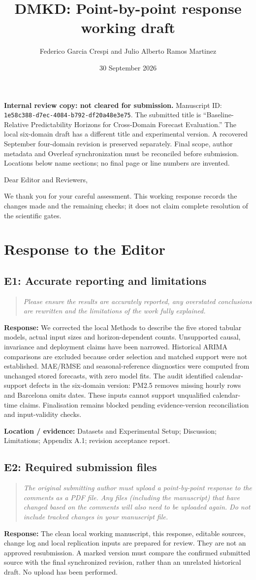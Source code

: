 \documentclass[11pt,a4paper]{article}
\title{DMKD: Point-by-point response working draft}
\author{Federico Garcia Crespi and Julio Alberto Ramos Martinez}
\date{30 September 2026}
\newcommand{\comment}[2]{\subsection*{#1}\begin{quote}\emph{#2}\end{quote}}
\newcommand{\response}[1]{\noindent\textcolor{responseblue}{\textbf{Response:}} #1\par\medskip}
\newcommand{\location}[1]{\noindent\textbf{Location / evidence:} #1\par\medskip}
\begin{document}
\maketitle
\noindent\textbf{Internal review copy: not cleared for submission.}
Manuscript ID: \texttt{1e58c388-d7ec-4084-b792-df20a48e3e75}.
The submitted title is ``Baseline-Relative Predictability Horizons for
Cross-Domain Forecast Evaluation.'' The local six-domain draft has a different
title and experimental version. A recovered September four-domain revision
is preserved separately. Final scope, author metadata and Overleaf
synchronization must be reconciled before submission. Locations below name
sections; no final page or line numbers are invented.

\medskip\noindent Dear Editor and Reviewers,

We thank you for your careful assessment. This working response records the
changes made and the remaining checks; it does not claim complete resolution
of the scientific gates.

\section*{Response to the Editor}
\comment{E1: Accurate reporting and limitations}{Please ensure the results are accurately reported, any overstated conclusions are rewritten and the limitations of the work fully explained.}
\response{We corrected the local Methods to describe the five stored tabular models, actual input sizes and horizon-dependent counts. Unsupported causal, invariance and deployment claims have been narrowed. Historical ARIMA comparisons are excluded because order selection and matched support were not established. MAE/RMSE and seasonal-reference diagnostics were computed from unchanged stored forecasts, with zero model fits. The audit identified calendar-support defects in the six-domain version: PM2.5 removes missing hourly rows and Barcelona omits dates. These inputs cannot support unqualified calendar-time claims. Finalisation remains blocked pending evidence-version reconciliation and input-validity checks.}
\location{Datasets and Experimental Setup; Discussion; Limitations; Appendix A.1; revision acceptance report.}
\comment{E2: Required submission files}{The original submitting author must upload a point-by-point response to the comments as a PDF file. Any files (including the manuscript) that have changed based on the comments will also need to be uploaded again. Do not include tracked changes in your manuscript file.}
\response{The clean local working manuscript, this response, editable sources, change log and local replication inputs are prepared for review. They are not an approved resubmission. A marked version must compare the confirmed submitted source with the final synchronized revision, rather than an unrelated historical draft. No upload has been performed.}
\end{document}
